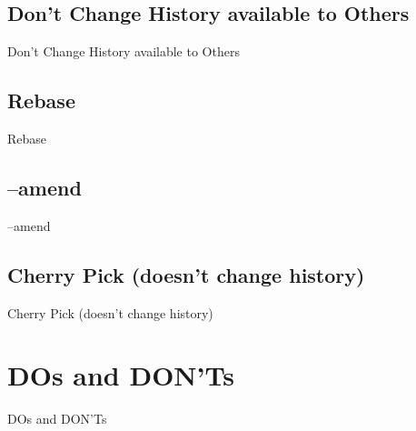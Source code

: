 \documentclass{beamer}
\begin{document}
\subsection{Don't Change History available to Others}

\begin{frame}{Don't Change History available to Others}
\end{frame}

\subsection{Rebase}

\begin{frame}{Rebase}
\end{frame}

\subsection{--amend}

\begin{frame}{--amend}
\end{frame}

\subsection{Cherry Pick (doesn't change history)}

\begin{frame}{Cherry Pick (doesn't change history)}
\end{frame}

\section{DOs and DON'Ts}

\begin{frame}{DOs and DON'Ts}
\end{frame}
\end{document}
